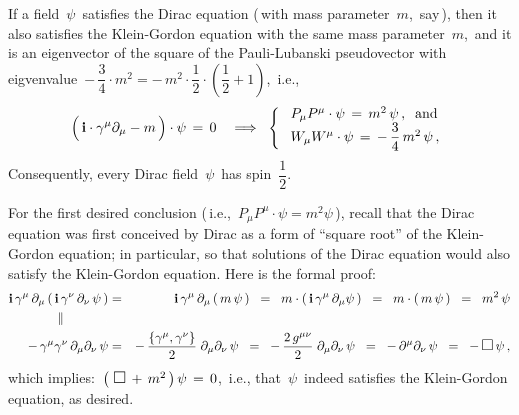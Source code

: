 \vskip 0.3cm
\begin{proposition}
\mbox{}
\vskip 0.15cm
\noindent
If a field \,$\psi$\, satisfies the Dirac equation (\,with mass parameter \,$m$,\, say\,),
then it also satisfies the Klein-Gordon equation with the same mass parameter \,$m$,\,
and it is an eigenvector of the square of the Pauli-Lubanski pseudovector with eigvenvalue 
\,$-\,\dfrac{3}{4} \cdot m^{2} = -\,m^{2}\cdot\dfrac{1}{2}\cdot\left(\dfrac{1}{2}+1\right)$,\, i.e.,
\begin{equation*}
\left(\,\i\cdot\gamma^{\mu}\partial_{\mu} \overset{{\color{white}.}}{-} m\,\right)\cdot\psi \,=\, 0
\quad\Longrightarrow\;\;
\left\{\;\begin{array}{l}
    P_{\mu}P^{\mu}\cdot\psi \,=\, m^{2}\,\psi\,, \;\;\textnormal{and}
    \\
    W_{\mu}W^{\mu}\cdot\psi \,=\, -\,\dfrac{3}{4}\,m^{2}\,\psi\,,
    \end{array}\right.
\end{equation*}
Consequently, {\color{red}every Dirac field \,$\psi$\, has spin \,$\dfrac{1}{2}$}.
\end{proposition}
\proof
For the first desired conclusion (\,i.e., \,$P_{\mu}P^{\mu}\cdot\psi = m^{2}\psi$\,),
recall that the Dirac equation was first conceived by Dirac as
a form of ``square root'' of the Klein-Gordon equation;
in particular, so that solutions of the Dirac equation
would also satisfy the Klein-Gordon equation.
Here is the formal proof:
\begin{eqnarray*}
\i\,\gamma^{\mu}\,\partial_{\mu}\left(\,\i\,\gamma^{\nu}\,\partial_{\nu}\,\psi\,\right)
& = &
    \i\,\gamma^{\mu}\,\partial_{\mu}\left(\,m\,\psi\,\right)
\;\; = \;\;
    m\cdot\left(\,\i\,\gamma^{\mu}\,\partial_{\mu}\psi\,\right)
\;\; = \;\;
    m\cdot\left(\,m\,\psi\,\right)
\;\; = \;\;
    m^{2}\,\psi
\\
\Vert\quad\quad\quad\,{\color{white}.}
&&
\\
    -\,\gamma^{\mu}\gamma^{\nu}\,\partial_{\mu}\partial_{\nu}\,\psi
& = &
    -\,\dfrac{\{\gamma^{\mu},\gamma^{\nu}\}}{2}\;\partial_{\mu}\partial_{\nu}\,\psi
\;\; = \;\;
    -\,\dfrac{2\,g^{\mu\nu}}{2}\;\partial_{\mu}\partial_{\nu}\,\psi
\;\; = \;\;
    -\,\partial^{\mu}\partial_{\nu}\,\psi
\;\; = \;\;
    -\,\textnormal{\large$\Box$}\,\psi\,,
\end{eqnarray*}
which implies: \,$\left(\;\textnormal{\large$\Box$} \,+\, m^{2}\,\right)\psi \,=\, 0$,\,
i.e., that \,$\psi$\, indeed satisfies the Klein-Gordon equation, as desired.

